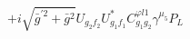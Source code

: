 %
\begin{dmath*}
%
  +  i \sqrt{{\bar g}^{\prime 2} + {\bar g}{}^2}U_{g_2 f_2} U_{g_1 f_1}^* C^{ \varphi  l1}_{g_1 g_2} \gamma^{\mu_5} P_L
%
\end{dmath*}
%

